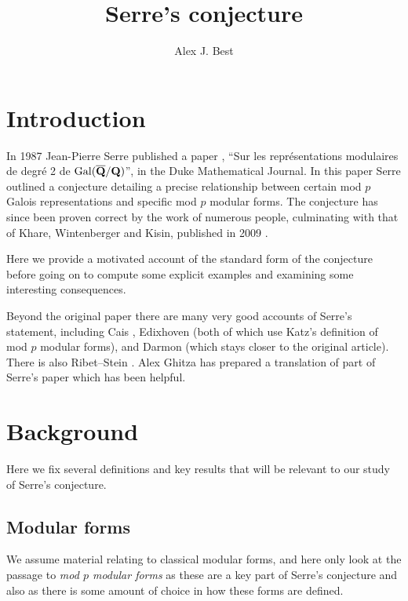 \documentclass[a4paper,12pt]{article}
\title{Serre's conjecture\vspace{-11pt}} %
\author{Alex J. Best}
\begin{document}
\maketitle
\vspace{-50pt}
\tableofcontents
\clearpage


\section{Introduction}
In 1987 Jean-Pierre Serre published a paper \cite{Serre87}, ``Sur les repr\'esentations modulaires de degr\'e 2 de $\operatorname{Gal}(\overline{\mathbf{Q}}/\mathbf{Q})$'', in the Duke Mathematical Journal.
In this paper Serre outlined a conjecture detailing a precise relationship between certain mod $p$ Galois representations and specific mod $p$ modular forms.
The conjecture has since been proven correct by the work of numerous people, culminating with that of Khare, Wintenberger and Kisin, published in 2009 \cite{KWI,KWII,Kisin}.

Here we provide a motivated account of the standard form of the conjecture before going on to compute some explicit examples and examining some interesting consequences.

Beyond the original paper there are many very good accounts of Serre's statement, including Cais \cite{Cais}, Edixhoven \cite{Edixhoven} (both of which use Katz's definition of mod $p$ modular forms), and Darmon \cite{Darmon} (which stays closer to the original article).
There is also Ribet--Stein \cite{RibetStein}. %
Alex Ghitza has prepared a translation of part of Serre's paper \cite{Ghitza} which has been helpful.


\section{Background}
Here we fix several definitions and key results that will be relevant to our study of Serre's conjecture.

\subsection{Modular forms}
We assume material relating to classical modular forms, and here only look at the passage to \emph{mod $p$ modular forms} as these are a key part of Serre's conjecture and also as there is some amount of choice in how these forms are defined.
\end{document}
